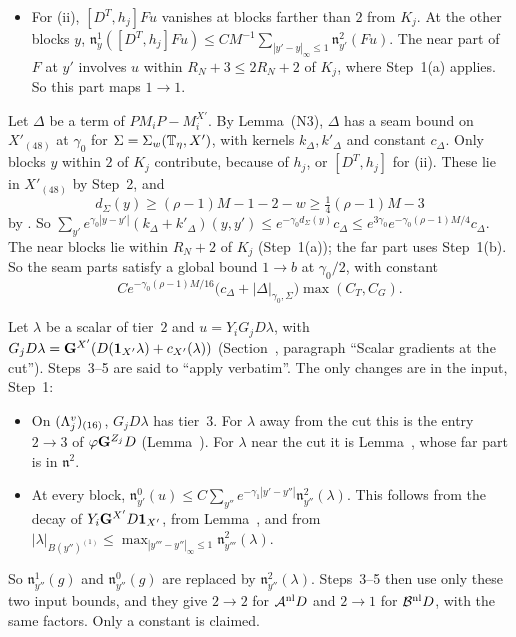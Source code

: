\begin{detail}
\begin{step}
\begin{itemize}
\item For (ii), $[D^T,h_j]Fu$ vanishes at blocks farther than $2$ from $K_j$. At the other blocks $y$, $\mathfrak n^1_y([D^T,h_j]Fu)\le CM^{-1}\sum_{|y'-y|_\infty\le1}\mathfrak n^2_{y'}(Fu)$. The near part of $F$ at $y'$ involves $u$ within $R_N+3\le2R_N+2$ of $K_j$, where Step~1(a) applies. So this part maps $1\to1$.
\end{itemize}
\end{step}
\begin{step}
Let $\Delta$ be a term of $PM_iP-M_i^{X'}$. By Lemma~(N3), $\Delta$ has a seam bound on $X'_{(48)}$ at $\gamma_0$ for $\Sigma=\Sigma_w(\mathbb T_\eta,X')$, with kernels $k_\Delta,k'_\Delta$ and constant $c_\Delta$. Only blocks $y$ within $2$ of $K_j$ contribute, because of $h_j$, or $[D^T,h_j]$ for (ii). These lie in $X'_{(48)}$ by Step~2, and
\[
d_\Sigma(y)\ge(\rho-1)M-1-2-w\ge\tfrac14(\rho-1)M-3
\]
by . So $\sum_{y'}e^{\gamma_0|y-y'|}(k_\Delta+k'_\Delta)(y,y')\le e^{-\gamma_0d_\Sigma(y)}c_\Delta\le e^{3\gamma_0}e^{-\gamma_0(\rho-1)M/4}c_\Delta$. The near blocks lie within $R_N+2$ of $K_j$ (Step~1(a)); the far part uses Step~1(b). So the seam parts satisfy a global bound $1\to b$ at $\gamma_0/2$, with constant
\[
Ce^{-\gamma_0(\rho-1)M/16}\big(c_\Delta+|\Delta|_{\gamma_0,\Sigma}\big)\max(C_T,C_G) .
\]
\end{step}
\begin{step}[An external $D$]
Let $\lambda$ be a scalar of tier~$2$ and $u=Y_iG_jD\lambda$, with $G_jD\lambda=\mathbf G^{X'}(D(\mathbf 1_{X'}\lambda)+c_{X'}(\lambda))$ (Section~, paragraph ``Scalar gradients at the cut''). Steps~3--5 are said to ``apply verbatim''. The only changes are in the input, Step~1:
\begin{itemize}
\item On $(\Lambda^v_j)_{(16)}$, $G_jD\lambda$ has tier~$3$. For $\lambda$ away from the cut this is the entry $2\to3$ of $\varphi\mathbf G^{Z_j}D$ (Lemma~). For $\lambda$ near the cut it is Lemma~, whose far part is in $\mathfrak n^2$.
\item At every block, $\mathfrak n^0_{y'}(u)\le C\sum_{y''}e^{-\gamma_1|y'-y''|}\mathfrak n^2_{y''}(\lambda)$. This follows from the decay of $Y_i\mathbf G^{X'}D\mathbf 1_{X'}$, from Lemma~, and from $|\lambda|_{B(y'')^{(1)}}\le\max_{|y'''-y''|_\infty\le1}\mathfrak n^2_{y'''}(\lambda)$.
\end{itemize}
So $\mathfrak n^1_{y''}(g)$ and $\mathfrak n^0_{y''}(g)$ are replaced by $\mathfrak n^2_{y''}(\lambda)$. Steps~3--5 then use only these two input bounds, and they give $2\to2$ for $\mathcal A^{\rm nl}D$ and $2\to1$ for $\mathcal B^{\rm nl}D$, with the same factors. Only a constant is claimed.

\end{step}
\end{detail}
